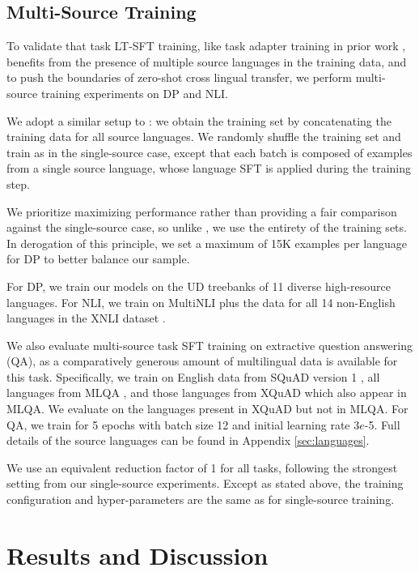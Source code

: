 \subsection{Multi-Source Training}
\label{ss:exp-ms}
To validate that task LT-SFT training, like task adapter training in prior work \cite{ansell-etal-2021-mad-g}, benefits from the presence of multiple source languages in the training data, and to push the boundaries of zero-shot cross lingual transfer, we perform multi-source training experiments on DP and NLI.

We adopt a similar setup to \citet{ansell-etal-2021-mad-g}: we obtain the training set by concatenating the training data for all source languages. We randomly shuffle the training set and train as in the single-source case, except that each batch is composed of examples from a single source language, whose language SFT is applied during the training step.

We prioritize maximizing performance rather than providing a fair comparison against the single-source case, so unlike \citet{ansell-etal-2021-mad-g}, we use the entirety of the training sets. In derogation of this principle, we set a maximum of 15K examples per language for DP to better balance our sample.

For DP, we train our models on the UD treebanks of 11 diverse high-resource languages. For NLI, we train on MultiNLI \citep{williams-etal-2018-broad} plus the data for all 14 non-English languages in the XNLI dataset \citep{conneau-etal-2018-xnli}. 

We also evaluate multi-source task SFT training on extractive question answering (QA), as a comparatively generous amount of multilingual data is available for this task. Specifically, we train on English data from SQuAD version 1 \citep{rajpurkar-etal-2016-squad}, all languages from MLQA \citep{lewis-etal-2020-mlqa}, and those languages from XQuAD \citep{artetxe-etal-2020-cross} which also appear in MLQA. We evaluate on the languages present in XQuAD but not in MLQA. For QA, we train for 5 epochs with batch size 12 and initial learning rate 3$e$-5. Full details of the source languages can be found in Appendix \ref{sec:languages}.

We use an equivalent reduction factor of 1 for all tasks, following the strongest setting from our single-source experiments. Except as stated above, the training configuration and hyper-parameters are the same as for single-source training.

\section{Results and Discussion}
\label{sec:results}

